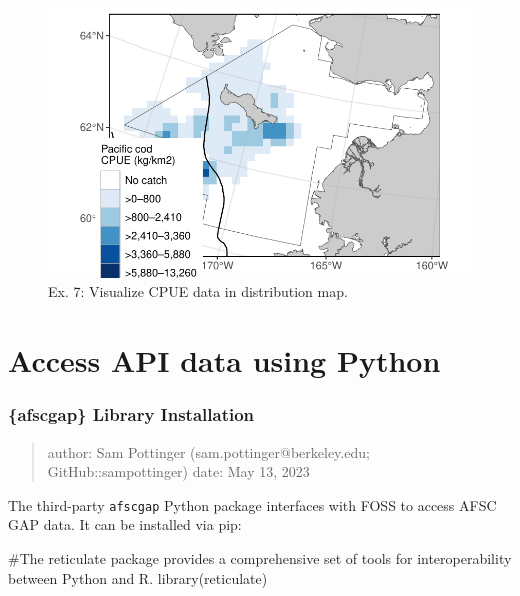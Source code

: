 \documentclass[
  letterpaper,
  oneside,
  open=any]{scrbook}
\newenvironment{Shaded}{\begin{snugshade}}{\end{snugshade}}
\newcommand{\CommentTok}[1]{\textcolor[rgb]{0.37,0.37,0.37}{#1}}
\newcommand{\FunctionTok}[1]{\textcolor[rgb]{0.28,0.35,0.67}{#1}}
\newcommand{\NormalTok}[1]{\textcolor[rgb]{0.00,0.23,0.31}{#1}}
\begin{document}
\begin{figure}[H]

{\centering \includegraphics{content/foss-api-r_files/figure-pdf/test-7-fig-1.pdf}

}

\caption{Ex. 7: Visualize CPUE data in distribution map.}

\end{figure}

\hypertarget{access-api-data-using-python}{%
\chapter{Access API data using
Python}\label{access-api-data-using-python}}

\hypertarget{afscgap-library-installation}{%
\subsection{\{afscgap\} Library
Installation}\label{afscgap-library-installation}}

\begin{quote}
author: Sam Pottinger (sam.pottinger@berkeley.edu; GitHub::sampottinger)
date: May 13, 2023
\end{quote}

The third-party \texttt{afscgap} Python package interfaces with FOSS to
access AFSC GAP data. It can be installed via pip:

\begin{Shaded}
\begin{Highlighting}[]
\CommentTok{\#The reticulate package provides a comprehensive set of tools for interoperability between Python and R. }
\FunctionTok{library}\NormalTok{(reticulate)}
\end{Highlighting}
\end{Shaded}
\end{document}
